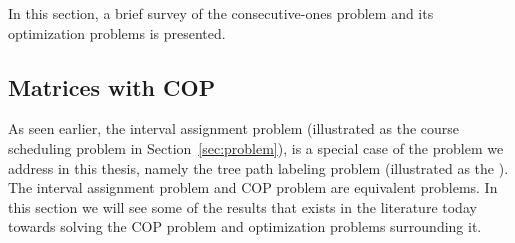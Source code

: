 In this section, a brief survey of the consecutive-ones problem and
its optimization problems is presented.


\subsection{Matrices with COP}
\label{sec:copmatrices}
As seen earlier, the interval assignment problem (illustrated as the
course scheduling problem in Section~\ref{sec:problem}), is a special
case of the problem we address in this thesis, namely the tree path
labeling problem (illustrated as the \illustrationproblem). The
interval assignment problem and COP problem are equivalent
problems. In this section we will see some of the results that exists
in the literature today towards solving the COP problem and
optimization problems surrounding it.



